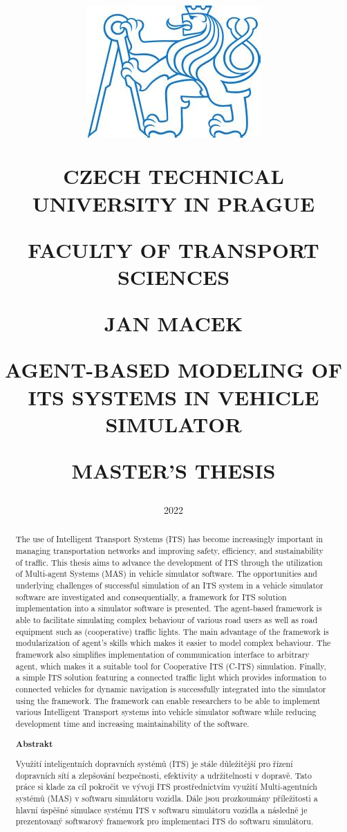 \documentclass[titlepage, 12pt]{article}
\title{
\includegraphics[width=.3\textwidth]{cvut-logo.jpg}\par
\vspace{10mm}
\indent
\textbf{CZECH TECHNICAL UNIVERSITY IN PRAGUE}

FACULTY OF TRANSPORT SCIENCES

\vfill

{\Large JAN MACEK}
\vspace{10mm}

AGENT-BASED MODELING OF ITS SYSTEMS IN VEHICLE SIMULATOR 
\vspace{15mm}

{\Large MASTER'S THESIS}
\vfill

}
\date{\Large 2022}
\begin{document}
\setlength{\baselineskip}{1.5em}
\maketitle




\begin{abstract}
    The use of Intelligent Transport Systems (ITS) has become increasingly important in
    managing transportation networks and improving safety, efficiency, and sustainability of traffic. This
    thesis aims to advance the development of ITS through the utilization of Multi-agent
    Systems (MAS) in vehicle simulator software. The opportunities and underlying challenges of
    successful simulation of an ITS system in a vehicle simulator software are investigated
    and consequentially, a framework for ITS solution implementation into a simulator software
    is presented. The agent-based framework is able to facilitate simulating complex behaviour
    of various road users as well as road equipment such as (cooperative) traffic lights. The
    main advantage of the framework is modularization of agent's skills which makes it easier
    to model complex behaviour. The framework also simplifies implementation of communication
    interface to arbitrary agent, which makes it a suitable tool for Cooperative ITS (C-ITS)
    simulation. Finally, a simple ITS solution featuring a connected traffic light which
    provides information to connected vehicles for dynamic navigation is successfully
    integrated into the simulator using the framework. The framework can enable researchers to
    be able to implement various Intelligent Transport systems into vehicle simulator software
    while reducing development time and increasing maintainability of the software.
    \bigskip \newline
    \begin{center}
    \large\bfseries Abstrakt
    \end{center}
    Využití inteligentních dopravních systémů (ITS) je stále důležitější pro řízení dopravních sítí
    a zlepšování bezpečnosti, efektivity a udržitelnosti v dopravě. Tato práce si klade za cíl
    pokročit ve vývoji ITS prostřednictvím využití Multi-agentních systémů (MAS) v softwaru
    simulátoru vozidla. Dále jsou prozkoumány příležitosti a hlavní úspěšné simulace systému
    ITS v softwaru
    simulátoru vozidla a následně je prezentovaný softwarový framework pro implementaci ITS do softwaru simulátoru.

\end{abstract}
\end{document}
